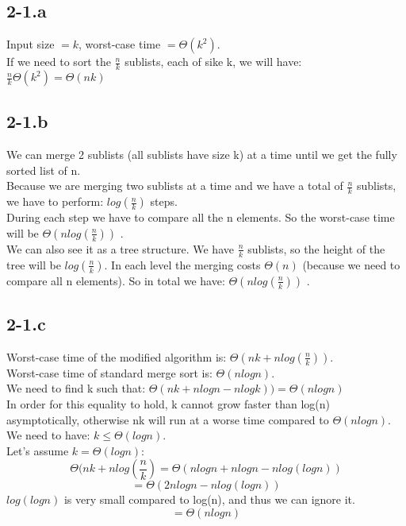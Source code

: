 \subsection*{2-1.a}
Input size $= k$, worst-case time $= \Theta(k^2)$.\\
If we need to sort the $\frac{n}{k}$ sublists, each of sike k, we will have:\\
$\frac{n}{k}\Theta(k^2) = \Theta(nk)$
\subsection*{2-1.b}
We can merge 2 sublists (all sublists have size k) at a time until we get the fully sorted list of n.\\
Because we are merging two sublists at a time and we have a total of $\frac{n}{k}$ sublists, we have to perform: $log(\frac{n}{k})$ steps.\\
During each step we have to compare all the n elements. So the worst-case time will be $\Theta(nlog(\frac{n}{k}))$ .\\
We can also see it as a tree structure. We have $\frac{n}{k}$ sublists, so the height of the tree will be $log(\frac{n}{k})$. In each level the merging costs $\Theta(n)$ (because we need to compare all n elements). So in total we have:  $\Theta(nlog(\frac{n}{k}))$ .
\subsection*{2-1.c}
Worst-case time of the modified algorithm is: $\Theta(nk + nlog(\frac{n}{k}))$. \\
Worst-case time of standard merge sort is: $\Theta(nlogn)$.\\
We need to find k such that:  $\Theta(nk + nlogn - nlogk)) = \Theta(nlogn)$\\
In order for this equality to hold, k cannot grow faster than log(n) asymptotically, otherwise nk will run at a worse time compared to $\Theta(nlogn)$. We need to have: $k \leq \Theta(logn)$.\\
Let's assume $k = \Theta(logn)$:
\begin{equation*}
	\Theta(nk + nlog(\frac{n}{k}) = \Theta(nlogn + nlogn - nlog(logn))
\end{equation*}
\begin{equation*}
	= \Theta(2nlogn - nlog(logn))
\end{equation*}
$log(logn)$ is very small compared to log(n), and thus we can ignore it.
\begin{equation*}
	= \Theta(nlogn)
\end{equation*}
